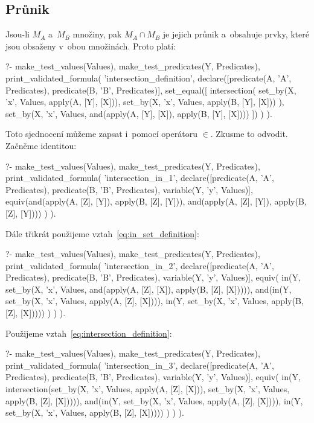 \subsection{Průnik}
Jsou-li \(M_A\) a~\(M_B\) množiny, pak \(M_A \cap M_B\) je jejich průnik a~obsahuje prvky, které jsou obsaženy v~obou množinách. Proto platí:

\begin{prolog}
?- 	make_test_values(Values),
	make_test_predicates(Y, Predicates),
	print_validated_formula(
		'intersection_definition',
		declare([predicate(A, 'A', Predicates), predicate(B, 'B', Predicates)],
			set_equal([
				intersection(
					set_by(X, 'x', Values, apply(A, [Y], [X])),
					set_by(X, 'x', Values, apply(B, [Y], [X]))
				),
				set_by(X, 'x', Values, and(apply(A, [Y], [X]), apply(B, [Y], [X])))
			])
		)
	).
\end{prolog}

Toto sjednocení můžeme zapsat i~pomocí operátoru \(\in\). Zkusme to odvodit. Začněme identitou:
\begin{prolog}
?- 	make_test_values(Values),
	make_test_predicates(Y, Predicates),
	print_validated_formula(
		'intersection_in_1',
		declare([predicate(A, 'A', Predicates), predicate(B, 'B', Predicates), variable(Y, 'y', Values)],
			equiv(and(apply(A, [Z], [Y]), apply(B, [Z], [Y])), and(apply(A, [Z], [Y]), apply(B, [Z], [Y])))
		)
	).
\end{prolog}

Dále třikrát použijeme vztah~\eqref{eq:in_set_definition}:
\begin{prolog}
?- 	make_test_values(Values),
	make_test_predicates(Y, Predicates),
	print_validated_formula(
		'intersection_in_2',
		declare([predicate(A, 'A', Predicates), predicate(B, 'B', Predicates), variable(Y, 'y', Values)],
			equiv(
				in(Y, set_by(X, 'x', Values, and(apply(A, [Z], [X]), apply(B, [Z], [X])))),
				and(in(Y, set_by(X, 'x', Values, apply(A, [Z], [X]))), in(Y, set_by(X, 'x', Values, apply(B, [Z], [X]))))
			)
		)
	).
\end{prolog}

Použijeme vztah~\eqref{eq:intersection_definition}:
\begin{prolog}
?- 	make_test_values(Values),
	make_test_predicates(Y, Predicates),
	print_validated_formula(
		'intersection_in_3',
		declare([predicate(A, 'A', Predicates), predicate(B, 'B', Predicates), variable(Y, 'y', Values)],
			equiv(
				in(Y, intersection(set_by(X, 'x', Values, apply(A, [Z], [X])), set_by(X, 'x', Values, apply(B, [Z], [X])))),
				and(in(Y, set_by(X, 'x', Values, apply(A, [Z], [X]))), in(Y, set_by(X, 'x', Values, apply(B, [Z], [X]))))
			)
		)
	).
\end{prolog}

